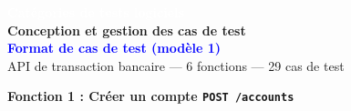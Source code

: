 \documentclass[12pt,a4paper,landscape]{article}
\begin{document}
\begin{center}
  {\Large\bfseries\colorbox{titlebg}{\textcolor{white}{\quad Catégories de tests logiciels \quad}}}\\[0.5cm]
  {\large\bfseries\textcolor{rowtitle}{Conception et gestion des cas de test}}\\[0.2cm]
  {\large\bfseries\textcolor{blue}{Format de cas de test (modèle 1)}}\\[0.5cm]
  {\normalsize API de transaction bancaire — 6 fonctions — 29 cas de test}
\end{center}

\vspace{0.3cm}
{\bfseries\large\textcolor{rowtitle}{Fonction 1 : Créer un compte \quad \texttt{POST /accounts}}}
\vspace{0.2cm}
\end{document}
